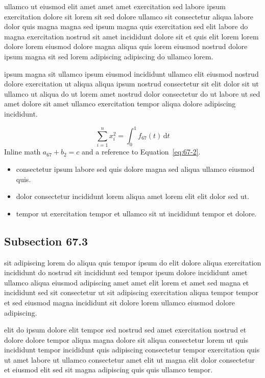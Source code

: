 \documentclass{article}
\begin{document}
ullamco ut eiusmod elit amet amet amet exercitation sed labore ipsum exercitation dolore sit lorem sit sed dolore ullamco sit consectetur aliqua labore dolor quis magna magna sed ipsum magna quis exercitation sed elit labore do magna exercitation nostrud sit amet incididunt dolore sit et quis elit lorem lorem dolore lorem eiusmod dolore magna aliqua quis lorem eiusmod nostrud dolore ipsum magna sit sed lorem adipiscing adipiscing do ullamco lorem.

ipsum magna sit ullamco ipsum eiusmod incididunt ullamco elit eiusmod nostrud dolore exercitation ut aliqua aliqua ipsum nostrud consectetur sit elit dolor sit ut ullamco ut aliqua do ut lorem amet nostrud dolor consectetur do ut labore ut sed amet dolore sit amet ullamco exercitation tempor aliqua dolore adipiscing incididunt.

\begin{equation}\label{eq:67-2}
  \sum_{i=1}^{n} x_i^{2} = \int_0^1 f_{67}(t)\,\mathrm{d}t
\end{equation}
Inline math $a_{67} + b_{2} = c$ and a reference to Equation~\eqref{eq:67-2}.

\begin{itemize}
  \item consectetur ipsum labore sed quis dolore magna sed aliqua ullamco eiusmod quis.
  \item dolor consectetur incididunt lorem aliqua amet lorem elit elit dolor sed ut.
  \item tempor ut exercitation tempor et ullamco sit ut incididunt tempor et dolore.
\end{itemize}

\subsection{Subsection 67.3}\label{sec:67-3}
sit adipiscing lorem do aliqua quis tempor ipsum do elit dolore aliqua exercitation incididunt do nostrud sit incididunt sed tempor ipsum dolore incididunt amet ullamco aliqua eiusmod adipiscing amet amet elit lorem et amet sed magna et incididunt sed sit consectetur ut sit adipiscing exercitation aliqua tempor tempor et sed eiusmod magna incididunt sit dolore lorem ullamco eiusmod dolore adipiscing.

elit do ipsum dolore elit tempor sed nostrud sed amet exercitation nostrud et dolore dolore tempor aliqua magna dolore sit aliqua consectetur lorem ut quis incididunt tempor incididunt quis adipiscing consectetur tempor exercitation quis ut amet labore ut ullamco consectetur amet elit ut magna elit dolor consectetur et eiusmod elit sed sit magna adipiscing quis quis ullamco tempor.
\end{document}
